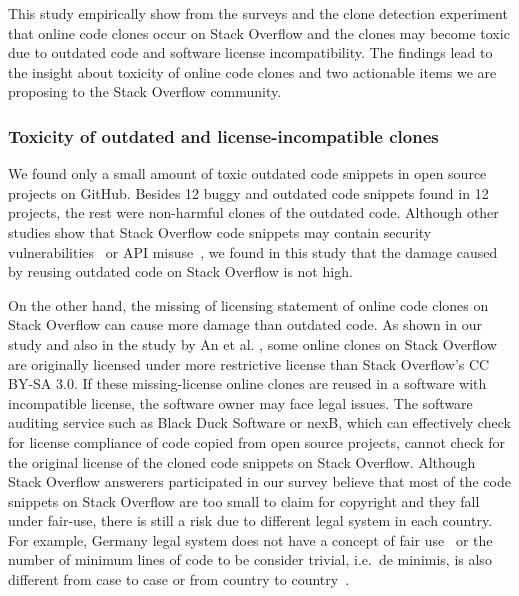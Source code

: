\documentclass[10pt,journal,compsoc]{IEEEtran}
\begin{document}

This study empirically show from the surveys and the clone detection experiment that
online code clones occur on Stack Overflow and the clones may become toxic due
to outdated code and software license incompatibility. The findings lead to the
insight about toxicity of online code clones and two actionable items
we are proposing to the Stack Overflow community.

\subsubsection{Toxicity of outdated and license-incompatible clones}
We found only a small amount of toxic outdated code snippets in open source projects on
GitHub. Besides 12 buggy and outdated code snippets found in 12 projects, the
rest were non-harmful clones of the outdated code. Although other studies show
that Stack Overflow code snippets may contain security
vulnerabilities~\cite{Acar2016,Fischer2017} or API misuse~\cite{Zhang2018}, we
found in this study that the damage caused by reusing outdated code on Stack
Overflow is not high.

On the other hand, the missing of licensing statement of online code clones on
Stack Overflow can cause more damage than outdated code. As shown in our study and
also in the study by An et al. \cite{An2017}, some online clones on Stack Overflow are
originally licensed under more restrictive license than Stack Overflow's CC
BY-SA 3.0. If these missing-license online clones are reused in a software with
incompatible license, the software owner may face legal issues. The software
auditing service such as Black Duck Software or nexB, which can effectively
check for license compliance of code copied from open source projects, cannot
check for the original license of the cloned code snippets on Stack Overflow. Although
Stack Overflow answerers participated in our survey believe that most of the
code snippets on Stack Overflow are too small to claim for copyright and they
fall under fair-use, there is still a risk due to different legal system in each
country. For example, Germany legal system does not have a concept of fair use~\cite{?}
or the number of minimum lines of code to be consider trivial, i.e.~de minimis,
is also different from case to case or from country to country~\cite{?}.
\end{document}
